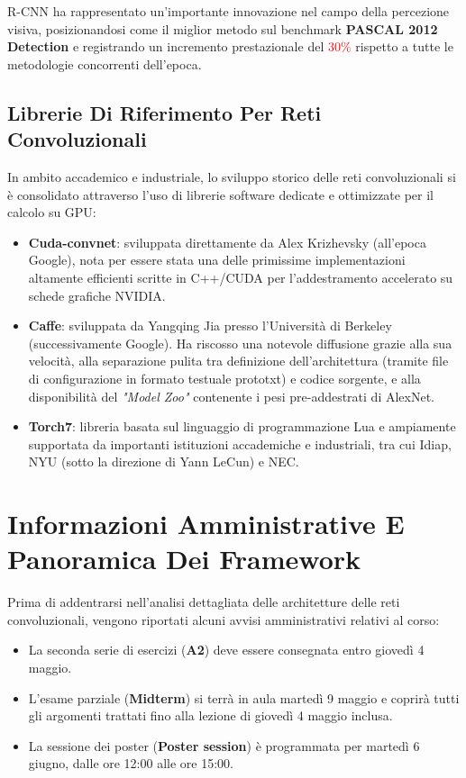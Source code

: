 ﻿\documentclass[11pt, a4paper]{article}
\begin{document}
R-CNN ha rappresentato un'importante innovazione nel campo della percezione visiva, posizionandosi come il miglior metodo sul benchmark \textbf{PASCAL 2012 Detection} e registrando un incremento prestazionale del \textcolor{red}{$30\%$} rispetto a tutte le metodologie concorrenti dell'epoca.

\newpage

\subsection{Librerie Di Riferimento Per Reti Convoluzionali}

In ambito accademico e industriale, lo sviluppo storico delle reti convoluzionali si è consolidato attraverso l'uso di librerie software dedicate e ottimizzate per il calcolo su GPU:

\begin{itemize}
    \item \textbf{Cuda-convnet}: sviluppata direttamente da Alex Krizhevsky (all'epoca Google), nota per essere stata una delle primissime implementazioni altamente efficienti scritte in C++/CUDA per l'addestramento accelerato su schede grafiche NVIDIA.
    \item \textbf{Caffe}: sviluppata da Yangqing Jia presso l'Università di Berkeley (successivamente Google). Ha riscosso una notevole diffusione grazie alla sua velocità, alla separazione pulita tra definizione dell'architettura (tramite file di configurazione in formato testuale prototxt) e codice sorgente, e alla disponibilità del \emph{"Model Zoo"} contenente i pesi pre-addestrati di AlexNet.
    \item \textbf{Torch7}: libreria basata sul linguaggio di programmazione Lua e ampiamente supportata da importanti istituzioni accademiche e industriali, tra cui Idiap, NYU (sotto la direzione di Yann LeCun) e NEC.
\end{itemize}


\section{Informazioni Amministrative E Panoramica Dei Framework}

Prima di addentrarsi nell'analisi dettagliata delle architetture delle reti convoluzionali, vengono riportati alcuni avvisi amministrativi relativi al corso:
\begin{itemize}
    \item La seconda serie di esercizi (\textbf{A2}) deve essere consegnata entro giovedì 4 maggio.
    \item L'esame parziale (\textbf{Midterm}) si terrà in aula martedì 9 maggio e coprirà tutti gli argomenti trattati fino alla lezione di giovedì 4 maggio inclusa.
    \item La sessione dei poster (\textbf{Poster session}) è programmata per martedì 6 giugno, dalle ore 12:00 alle ore 15:00.
\end{itemize}
\end{document}
